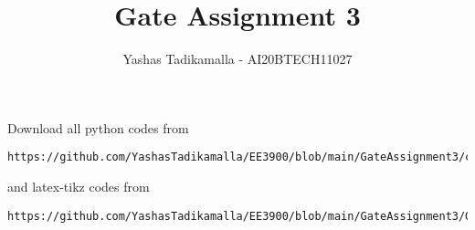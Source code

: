 \documentclass[journal,12pt,twocolumn]{IEEEtran}
\DeclareMathOperator*{\Res}{Res}
\begin{document}
\newcommand{\BEQA}{\begin{eqnarray}}
\newcommand{\EEQA}{\end{eqnarray}}
\newcommand{\define}{\stackrel{\triangle}{=}}

\raggedbottom
\setlength{\parindent}{0pt}
\providecommand{\mbf}{\mathbf}
\providecommand{\pr}[1]{\ensuremath{\Pr\left(#1\right)}}
\providecommand{\qfunc}[1]{\ensuremath{Q\left(#1\right)}}
\providecommand{\sbrak}[1]{\ensuremath{{}\left[#1\right]}}
\providecommand{\lsbrak}[1]{\ensuremath{{}\left[#1\right.}}
\providecommand{\rsbrak}[1]{\ensuremath{{}\left.#1\right]}}
\providecommand{\brak}[1]{\ensuremath{\left(#1\right)}}
\providecommand{\lbrak}[1]{\ensuremath{\left(#1\right.}}
\providecommand{\rbrak}[1]{\ensuremath{\left.#1\right)}}
\providecommand{\cbrak}[1]{\ensuremath{\left\{#1\right\}}}
\providecommand{\lcbrak}[1]{\ensuremath{\left\{#1\right.}}
\providecommand{\rcbrak}[1]{\ensuremath{\left.#1\right\}}}
\theoremstyle{remark}
\newtheorem{rem}{Remark}
\newtheorem*{remark}{Remark}
\newcommand{\sgn}{\mathop{\mathrm{sgn}}}
\providecommand{\abs}[1]{\vert#1\vert}
\providecommand{\res}[1]{\Res\displaylimits_{#1}} 
\providecommand{\norm}[1]{\lVert#1\rVert}
\providecommand{\mtx}[1]{\mathbf{#1}}
\providecommand{\mean}[1]{E[ #1 ]}
\providecommand{\fourier}{\overset{\mathcal{F}}{ \rightleftharpoons}}
\providecommand{\system}{\overset{\mathcal{H}}{ \longleftrightarrow}}
\newcommand{\solution}{\noindent \textbf{Solution: }}
\newcommand{\cosec}{\,\text{cosec}\,}
\providecommand{\dec}[2]{\ensuremath{\overset{#1}{\underset{#2}{\gtrless}}}}
\newcommand{\myvec}[1]{\ensuremath{\begin{pmatrix}#1\end{pmatrix}}}
\newcommand{\mydet}[1]{\ensuremath{\begin{vmatrix}#1\end{vmatrix}}}
\makeatletter
{}
\makeatother
\let\StandardTheFigure\thefigure
\let\vec\mathbf
\renewcommand{\thefigure}{\theproblem}
\def\putbox#1#2#3{\makebox[0in][l]{\makebox[#1][l]{}\raisebox{\baselineskip}[0in][0in]{\raisebox{#2}[0in][0in]{#3}}}}
     \def\rightbox#1{\makebox[0in][r]{#1}}
     \def\centbox#1{\makebox[0in]{#1}}
     \def\topbox#1{\raisebox{-\baselineskip}[0in][0in]{#1}}
     \def\midbox#1{\raisebox{-0.5\baselineskip}[0in][0in]{#1}}
\vspace{3cm}
\title{Gate Assignment 3}
\author{Yashas Tadikamalla - AI20BTECH11027}
\maketitle
\newpage
\bigskip
\renewcommand{\thefigure}{\theenumi}
\renewcommand{\thetable}{\theenumi}
Download all python codes from 
\begin{lstlisting}
https://github.com/YashasTadikamalla/EE3900/blob/main/GateAssignment3/codes
\end{lstlisting}
%
and latex-tikz codes from 
%
\begin{lstlisting}
https://github.com/YashasTadikamalla/EE3900/blob/main/GateAssignment3/GateAssignment3.tex
\end{lstlisting}
\end{document}
